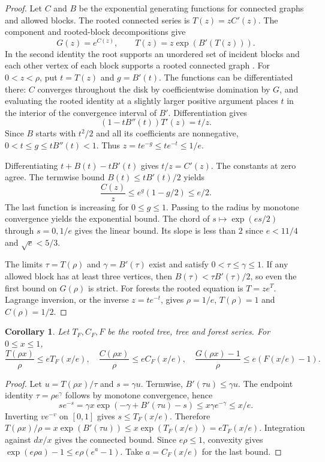 \documentclass[11pt]{article}
\newtheorem{corollary}[theorem]{Corollary}
\begin{document}
\begin{proof}
Let $C$ and $B$ be the exponential generating functions for connected graphs and allowed blocks. The rooted connected series is $T(z)=zC'(z)$. The component and rooted-block decompositions give
\[
 G(z)=e^{C(z)},\qquad T(z)=z\exp(B'(T(z))).
\]
In the second identity the root supports an unordered set of incident blocks and each other vertex of each block supports a rooted connected graph \cite{block}. For $0<z<\rho$, put $t=T(z)$ and $g=B'(t)$. The functions can be differentiated there: $C$ converges throughout the disk by coefficientwise domination by $G$, and evaluating the rooted identity at a slightly larger positive argument places $t$ in the interior of the convergence interval of $B'$. Differentiation gives
\[
 (1-tB''(t))T'(z)=t/z.
\]
Since $B$ starts with $t^2/2$ and all its coefficients are nonnegative, $0<t\le g\le tB''(t)<1$. Thus $z=t e^{-g}\le t e^{-t}\le1/e$.

Differentiating $t+B(t)-tB'(t)$ gives $t/z=C'(z)$. The constants at zero agree. The termwise bound $B(t)\le tB'(t)/2$ yields
\[
 \frac{C(z)}{z}\le e^g(1-g/2)\le e/2.
\]
The last function is increasing for $0\le g\le1$. Passing to the radius by monotone convergence yields the exponential bound. The chord of $s\mapsto\exp(es/2)$ through $s=0,1/e$ gives the linear bound. Its slope is less than $2$ since $e<11/4$ and $\sqrt e<5/3$.

The limits $\tau=T(\rho)$ and $\gamma=B'(\tau)$ exist and satisfy $0<\tau\le\gamma\le1$. If any allowed block has at least three vertices, then $B(\tau)<\tau B'(\tau)/2$, so even the first bound on $G(\rho)$ is strict. For forests the rooted equation is $T=ze^T$. Lagrange inversion, or the inverse $z=te^{-t}$, gives $\rho=1/e$, $T(\rho)=1$ and $C(\rho)=1/2$.
\end{proof}

\begin{corollary}\label{dom}
Let $T_F,C_F,F$ be the rooted tree, tree and forest series. For $0\le x\le1$,
\[
 \frac{T(\rho x)}{\rho}\le eT_F(x/e),\quad
 \frac{C(\rho x)}{\rho}\le eC_F(x/e),\quad
 \frac{G(\rho x)-1}{\rho}\le e(F(x/e)-1).
\]
\end{corollary}
\begin{proof}
Let $u=T(\rho x)/\tau$ and $s=\gamma u$. Termwise, $B'(\tau u)\le\gamma u$. The endpoint identity $\tau=\rho e^\gamma$ follows by monotone convergence, hence
\[
 se^{-s}=\gamma x\exp(-\gamma+B'(\tau u)-s)\le x\gamma e^{-\gamma}\le x/e.
\]
Inverting $v e^{-v}$ on $[0,1]$ gives $s\le T_F(x/e)$.
Therefore $T(\rho x)/\rho=x\exp(B'(\tau u))\le x\exp(T_F(x/e))=eT_F(x/e)$.
Integration against $dx/x$ gives the connected bound. Since $e\rho\le1$, convexity gives $\exp(e\rho a)-1\le e\rho(e^a-1)$. Take $a=C_F(x/e)$ for the last bound.
\end{proof}
\end{document}
